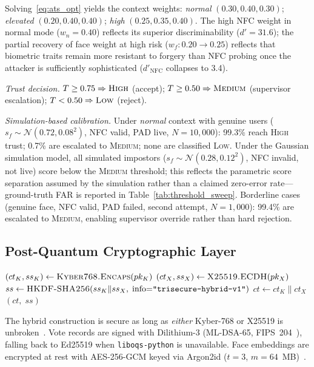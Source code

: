\documentclass[pdflatex,sn-mathphys-num]{sn-jnl}%
\theoremstyle{thmstyleone}%
\theoremstyle{thmstyletwo}%
\theoremstyle{thmstylethree}%
\begin{document}
Solving~\eqref{eq:ats_opt} yields the context weights: \textit{normal}
\((0.30, 0.40, 0.30)\); \textit{elevated} \((0.20, 0.40, 0.40)\);
\textit{high} \((0.25, 0.35, 0.40)\). The high NFC weight in normal mode
(\(w_n{=}0.40\)) reflects its superior discriminability (\(d'{=}31.6\)); the
partial recovery of face weight at high risk (\(w_f: 0.20\!\to\!0.25\))
reflects that biometric traits remain more resistant to forgery than NFC
probing once the attacker is sufficiently sophisticated
(\(d'_{\mathrm{NFC}}\) collapses to 3.4).

\textit{Trust decision.} \(T \geq 0.75\Rightarrow\textsc{High}\) (accept);
\(T \geq 0.50\Rightarrow\textsc{Medium}\) (supervisor escalation);
\(T < 0.50\Rightarrow\textsc{Low}\) (reject).

\textit{Simulation-based calibration.} Under \textit{normal} context with
genuine users (\(s_f \sim \mathcal{N}(0.72,0.08^2)\), NFC valid, PAD live,
\(N{=}10{,}000\)): 99.3\% reach \textsc{High} trust; 0.7\% are escalated to
\textsc{Medium}; none are classified \textsc{Low}. Under the Gaussian
simulation model, all simulated impostors (\(s_f \sim
\mathcal{N}(0.28,0.12^2)\), NFC invalid, not live) score below the
\textsc{Medium} threshold; this reflects the parametric score separation
assumed by the simulation rather than a claimed zero-error rate---ground-truth
FAR is reported in Table~\ref{tab:threshold_sweep}. Borderline cases (genuine
face, NFC valid, PAD failed, second attempt, \(N{=}1{,}000\)): 99.4\% are
escalated to \textsc{Medium}, enabling supervisor override rather than hard
rejection.

\subsection{Post-Quantum Cryptographic Layer}\label{sec:pqc}

\begin{algorithm}[t]
\caption{TRIsecure HybridKEM.Encapsulate(\(pk\))}
\begin{algorithmic}[1]
  \State \((ct_K, ss_K) \gets \textsc{Kyber768.Encaps}(pk_K)\)
  \State \((ct_X, ss_X) \gets \textsc{X25519.ECDH}(pk_X)\)
  \State \(ss \gets \textsc{HKDF-SHA256}(ss_K \| ss_X,\;
    \text{info}{=}\texttt{"trisecure-hybrid-v1"})\)
  \State \(ct \gets ct_K \| ct_X\)
  \State \Return \((ct,\; ss)\)
\end{algorithmic}
\end{algorithm}

The hybrid construction is secure as long as \emph{either} Kyber-768 or X25519
is unbroken~\cite{bernstein2017post}. Vote records are signed with Dilithium-3
(ML-DSA-65, FIPS~204~\cite{nist_fips204}), falling back to Ed25519 when
\texttt{liboqs-python} is unavailable. Face embeddings are encrypted at rest
with AES-256-GCM keyed via Argon2id (\(t{=}3\),
\(m{=}64\)~MB)~\cite{biryukov2015argon2}.
\end{document}
